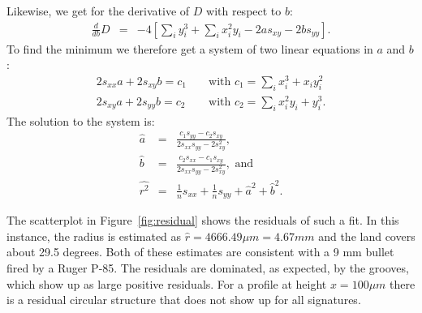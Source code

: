 \documentclass[aoas]{imsart}\usepackage[]{graphicx}\usepackage[]{color}
\begin{document}
\noindent
Likewise, we get for the derivative of $D$ with respect to $b$:
\begin{eqnarray*}
\frac{d}{db} D &=& -4 \left[ \sum_i y_i^3   + \sum_i x_i^2 y_i - 2a s_{xy} - 2b s_{yy} \right].
\end{eqnarray*}
To find the minimum we therefore get a system of two linear equations in $a$ and $b$:
\begin{eqnarray*}
2 s_{xx} a + 2 s_{xy} b = c_1 && \text{ with } c_1 = \sum_i x_i^3 + x_i y_i^2 \\
2 s_{xy} a + 2 s_{yy} b = c_2 &&\text{ with } c_2 = \sum_i x_i^2 y_i + y_i^3.
\end{eqnarray*}
The solution to the system is:
\begin{eqnarray*}
\hat{a} &=& \frac{c_1 s_{yy} - c_2 s_{xy}}{2 s_{xx} s_{yy} - 2 s_{xy}^2},\\
\hat{b} &=& \frac{c_2 s_{xx} - c_1 s_{xy}}{2 s_{xx} s_{yy} - 2 s_{xy}^2}, \text{ and}\\
\hat{r^2} &=& \frac{1}{n}s_{xx} + \frac{1}{n}s_{yy} + \hat{a}^2 + \hat{b}^2.
\end{eqnarray*}


The scatterplot in Figure~\ref{fig:residual} shows the residuals of such a fit.
In this instance, the radius is estimated as $\hat{r} = 4666.49\mu m = 4.67mm$ and the land covers about 29.5 degrees.  Both of these estimates are consistent with a 9 mm bullet fired by a Ruger P-85.
The residuals are dominated, as expected, by the grooves, which show up as large positive residuals. For a profile at height $x = 100\mu m$ there is a residual circular structure that does not show up for all signatures. 
\end{document}

